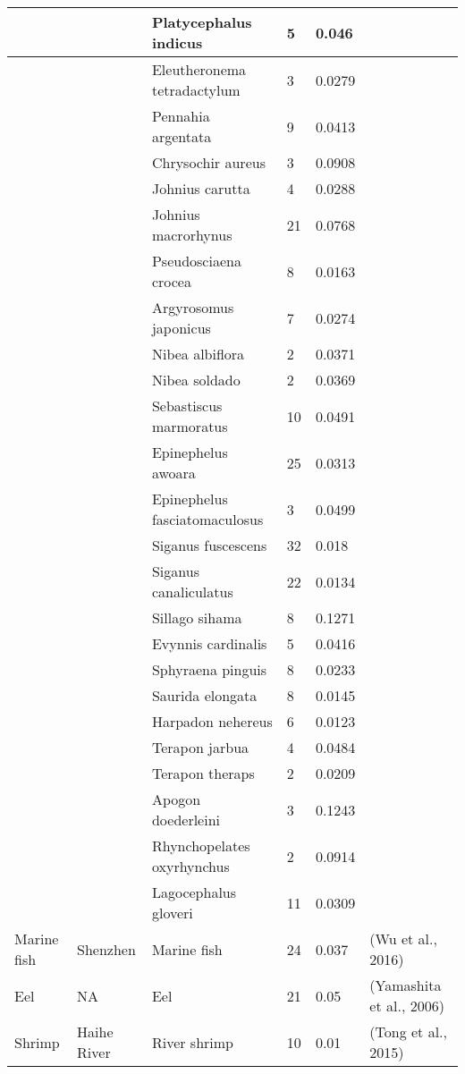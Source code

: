 \begin{center}
\begin{longtable}{ | p{2cm} | p{1.4cm} | p{3cm} | p{1.6cm} | p{1.9cm} | p{2.6cm} | }
 &  & Platycephalus indicus & 5 & 0.046  &   \\ \hline
 &  & Eleutheronema tetradactylum & 3 & 0.0279  &   \\ \hline
 &  & Pennahia argentata & 9 & 0.0413  &   \\ \hline
 &  & Chrysochir aureus & 3 & 0.0908  &   \\ \hline
 &  & Johnius carutta & 4 & 0.0288  &   \\ \hline
 &  & Johnius macrorhynus & 21 & 0.0768  &   \\ \hline
 &  & Pseudosciaena crocea & 8 & 0.0163  &   \\ \hline
 &  & Argyrosomus japonicus & 7 & 0.0274  &   \\ \hline
 &  & Nibea albiflora & 2 & 0.0371  &   \\ \hline
 &  & Nibea soldado & 2 & 0.0369  &   \\ \hline
 &  & Sebastiscus marmoratus & 10 & 0.0491  &   \\ \hline
 &  & Epinephelus awoara & 25 & 0.0313  &   \\ \hline
 &  & Epinephelus fasciatomaculosus & 3 & 0.0499 
 &   \\ \hline
 &  & Siganus fuscescens & 32 & 0.018  &   \\ \hline
 &  & Siganus canaliculatus & 22 & 0.0134  &   \\ \hline
 &  & Sillago sihama & 8 & 0.1271  &   \\ \hline
 &  & Evynnis cardinalis & 5 & 0.0416  &   \\ \hline
 &  & Sphyraena pinguis & 8 & 0.0233  &   \\ \hline
 &  & Saurida elongata & 8 & 0.0145  &   \\ \hline
 &  & Harpadon nehereus & 6 & 0.0123  &   \\ \hline
 &  & Terapon jarbua & 4 & 0.0484  &   \\ \hline
 &  & Terapon theraps & 2 & 0.0209  &   \\ \hline
 &  & Apogon doederleini & 3 & 0.1243  &   \\ \hline
 &  & Rhynchopelates oxyrhynchus & 2 & 0.0914  &   \\ \hline
 &  & Lagocephalus gloveri & 11 & 0.0309  &   \\ \hline
Marine fish & Shenzhen & Marine fish  & 24 & 0.037 & (Wu et al., 2016)  \\ \hline
Eel & NA & Eel & 21 & 0.05 & (Yamashita et al., 2006)   \\ \hline
Shrimp & Haihe River & River shrimp & 10 & 0.01 & (Tong et al., 2015)

\end{longtable}
\end{center}

